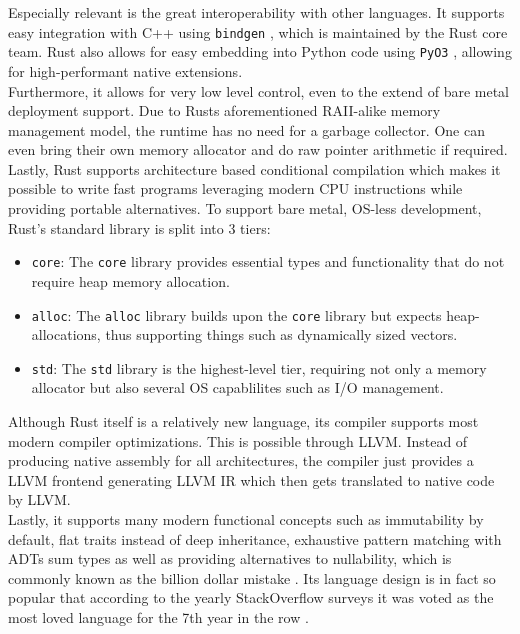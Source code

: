 Especially relevant is the great interoperability with other languages. It supports easy integration with C++ using \texttt{bindgen} \cite{bindgen}, which is maintained by the Rust core team. Rust also allows for easy embedding into Python code using \texttt{PyO3} \cite{pyo3}, allowing for high-performant native extensions.\\

Furthermore, it allows for very low level control, even to the extend of bare metal deployment support. Due to Rusts aforementioned \ac{RAII}-alike memory management model, the runtime has no need for a garbage collector. One can even bring their own memory allocator and do raw pointer arithmetic if required. Lastly, Rust supports architecture based conditional compilation which makes it possible to write fast programs leveraging modern CPU instructions while providing portable alternatives. To support bare metal, OS-less development, Rust's standard library is split into 3 tiers:

\begin{itemize}
  \item \texttt{core}: The \texttt{core} library provides essential types and functionality that do not require heap memory allocation.
  \item \texttt{alloc}: The \texttt{alloc} library builds upon the \texttt{core} library but expects heap-allocations, thus supporting things such as dynamically sized vectors.
  \item \texttt{std}: The \texttt{std} library is the highest-level tier, requiring not only a memory allocator but also several OS capablilites such as I/O management.
\end{itemize}

Although Rust itself is a relatively new language, its compiler supports most modern compiler optimizations. This is possible through \ac{LLVM}. Instead of producing native assembly for all architectures, the compiler just provides a \ac{LLVM} frontend generating \ac{LLVM} \ac{IR} which then gets translated to native code by \ac{LLVM}.\\

Lastly, it supports many modern functional concepts such as immutability by default, flat traits instead of deep inheritance, exhaustive pattern matching with \acp{ADT} sum types as well as providing alternatives to nullability, which is commonly known as the billion dollar mistake \cite{null}. Its language design is in fact so popular that according to the yearly StackOverflow surveys it was voted as the most loved language for the 7th year in the row \cite{sosurvey}.

